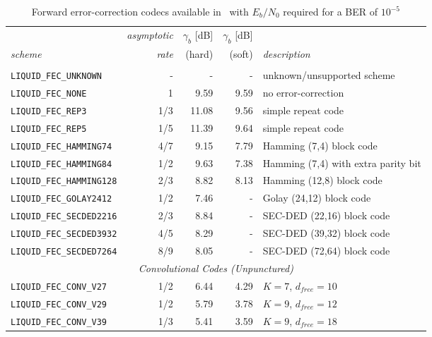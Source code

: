 \begin{table*}
\caption{Forward error-correction codecs available in \liquid\
         with $E_b/N_0$ required for a BER of $10^{-5}$}
\label{tab:fec:codecs}
\centering
{\small
\begin{tabular*}{0.95\textwidth}{l@{\extracolsep{\fill}}rrrl}
\toprule
             & {\it asymptotic} & {\it $\gamma_b$} [dB] & {\it $\gamma_b$} [dB] & \\
{\it scheme} & {\it rate}       & (hard)                & (soft)                & {\it description}\\\otoprule
%
\multicolumn{5}{c}{{\em Built-in Block Codes}}\\\midrule
{\tt LIQUID\_FEC\_UNKNOWN}      & -       &     - &     - & unknown/unsupported scheme\\
{\tt LIQUID\_FEC\_NONE}         & 1       &  9.59 &  9.59 & no error-correction\\
{\tt LIQUID\_FEC\_REP3}         & 1/3     & 11.08 &  9.56 & simple repeat code\\
{\tt LIQUID\_FEC\_REP5}         & 1/5     & 11.39 &  9.64 & simple repeat code\\
{\tt LIQUID\_FEC\_HAMMING74}    & 4/7     &  9.15 &  7.79 & Hamming (7,4) block code\\
{\tt LIQUID\_FEC\_HAMMING84}    & 1/2     &  9.63 &  7.38 & Hamming (7,4) with extra parity bit\\
{\tt LIQUID\_FEC\_HAMMING128}   & 2/3     &  8.82 &  8.13 & Hamming (12,8) block code\\
{\tt LIQUID\_FEC\_GOLAY2412}    & 1/2     &  7.46 &     - & Golay (24,12) block code\\
{\tt LIQUID\_FEC\_SECDED2216}   & 2/3     &  8.84 &     - & SEC-DED (22,16) block code\\
{\tt LIQUID\_FEC\_SECDED3932}   & 4/5     &  8.29 &     - & SEC-DED (39,32) block code\\
{\tt LIQUID\_FEC\_SECDED7264}   & 8/9     &  8.05 &     - & SEC-DED (72,64) block code\\\midrule
%
\multicolumn{5}{c}{{\em Convolutional Codes (Unpunctured)}}\\\midrule
{\tt LIQUID\_FEC\_CONV\_V27}    & 1/2     &  6.44 & 4.29 & $K=7$, $d_{free}=10$\\
{\tt LIQUID\_FEC\_CONV\_V29}    & 1/2     &  5.79 & 3.78 & $K=9$, $d_{free}=12$\\
{\tt LIQUID\_FEC\_CONV\_V39}    & 1/3     &  5.41 & 3.59 & $K=9$, $d_{free}=18$\\

\end{tabular*}}
\end{table*}
